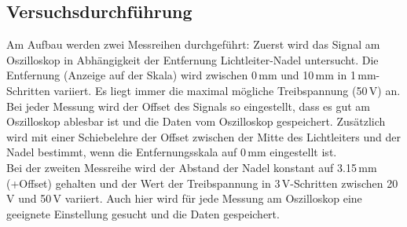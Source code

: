 \subsection{Versuchsdurchführung}

Am Aufbau werden zwei Messreihen durchgeführt:
Zuerst wird das Signal am Oszilloskop in Abhängigkeit der Entfernung Lichtleiter-Nadel untersucht.
Die Entfernung (Anzeige auf der Skala) wird zwischen 0\,mm und 10\,mm in 1\,mm-Schritten variiert.
Es liegt immer die maximal mögliche Treibspannung (50\,V) an.
Bei jeder Messung wird der Offset des Signals so eingestellt,
dass es gut am Oszilloskop ablesbar ist und die Daten vom Oszilloskop gespeichert.
Zusätzlich wird mit einer Schiebelehre der Offset zwischen der Mitte des Lichtleiters und der Nadel bestimmt,
wenn die Entfernungsskala auf 0\,mm eingestellt ist.\\
Bei der zweiten Messreihe wird der Abstand der Nadel konstant auf 3.15\,mm (+Offset)
gehalten und der Wert der Treibspannung in 3\,V-Schritten zwischen 20\,V und 50\,V variiert.
Auch hier wird für jede Messung am Oszilloskop eine geeignete Einstellung gesucht und die Daten gespeichert.